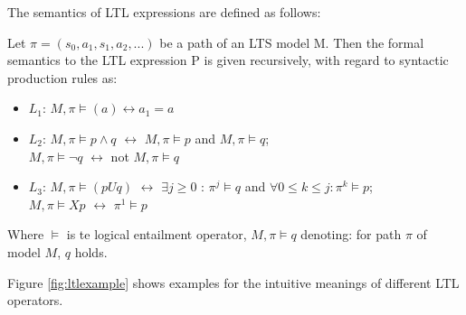 The semantics of LTL expressions are defined as follows:
\begin{definition}
	Let $\pi = (s_0, a_1, s_1, a_2, ... )$ be a path of an LTS model M. Then the formal semantics to the LTL expression P is given recursively, with regard to syntactic production rules as:
	\begin{itemize}
		\item $L_1$: $M,\pi \vDash (a) \leftrightarrow a_1 = a$ 
		\item $L_2$: $M,\pi \vDash p \land q$ $\leftrightarrow$  $M,\pi \vDash p$ and  $M,\pi \vDash q$; \\
					$M,\pi \vDash \neg q$ $\leftrightarrow$ not  $M,\pi \vDash q$
		\item $L_3$: $M,\pi \vDash (p U q)$ $\leftrightarrow$  $\exists j \geq 0$ : $\pi^j \vDash q$ and $\forall 0 \leq k \leq j : \pi^k \vDash p$; \\
		$M,\pi \vDash X p$ $\leftrightarrow$ $\pi^1 \vDash p$
	\end{itemize}
	Where $\vDash$ is te logical entailment operator, $M,\pi \vDash q$ denoting: for path $\pi$ of model $M$, $q$ holds.
\end{definition}

Figure \ref{fig:ltlexample} shows examples for the intuitive meanings of different LTL operators.

